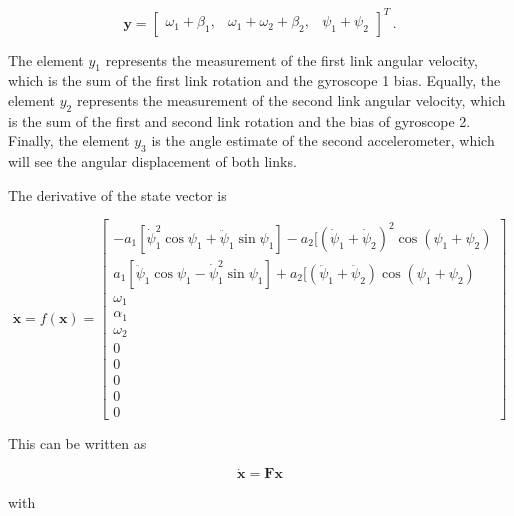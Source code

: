 \begin{equation} \label{eq:measurement_vector}
  \mathbf{y} = \begin{bmatrix}
  	\omega_1 + \beta_1, & \omega_1 + \omega_2 + \beta_2, & \psi_1 + \psi_2
  \end{bmatrix}^T\,.
\end{equation}
 
\noindent
The element $y_1$ represents the measurement of the first link angular velocity, which is the sum of the first link rotation and the gyroscope 1 bias. Equally, the element $y_2$ represents the measurement of the second link angular velocity, which is the sum of the first and second link rotation and the bias of gyroscope 2. Finally, the element $y_3$ is the angle estimate of the second accelerometer, which will see the angular displacement of both links.

The derivative of the state vector is

\begin{equation} \label{eq:state_vector_derivative}
  \dot{\mathbf{x}} = f(\mathbf{x}) = \left[\begin{smallmatrix}
  -a_1 [\dot{\psi}^2_1 \cos \psi_1 + \ddot{\psi}_1 \sin \psi_1] - a_2 [(\dot{\psi}_1 + \dot{\psi}_2)^2 \cos(\psi_1 + \psi_2) \\
  a_1 [\ddot{\psi}_1 \cos \psi_1 - \dot{\psi}^2_1 \sin \psi_1] + a_2 [(\ddot{\psi}_1 + \ddot{\psi}_2) \cos(\psi_1 + \psi_2) \\ \omega_1 \\ \alpha_1 \\ \omega_2 \\ 0 \\ 0 \\ 0 \\ 0 \\ 0
  \end{smallmatrix}\right]
\end{equation}

\noindent
This can be written as

\begin{equation}
  \dot{\mathbf{x}} = \mathbf{F} \mathbf{x}
\end{equation}

\noindent
with

